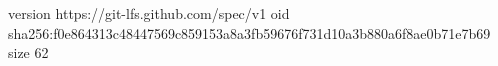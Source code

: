 version https://git-lfs.github.com/spec/v1
oid sha256:f0e864313c48447569c859153a8a3fb59676f731d10a3b880a6f8ae0b71e7b69
size 62
